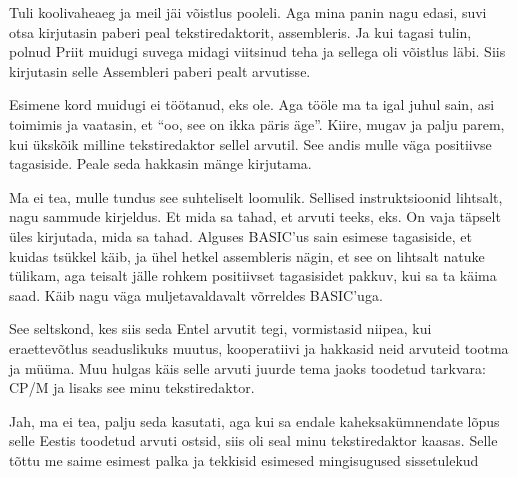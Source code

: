 Tuli koolivaheaeg ja meil jäi võistlus pooleli. Aga mina panin nagu edasi, suvi 
otsa kirjutasin paberi peal tekstiredaktorit, assembleris. Ja kui tagasi tulin, 
polnud  Priit muidugi suvega midagi viitsinud teha ja sellega oli võistlus 
läbi. Siis kirjutasin selle Assembleri paberi pealt arvutisse.


Esimene kord muidugi ei töötanud, eks ole. Aga tööle ma ta igal juhul sain, asi 
toimimis ja  vaatasin, et \enquote{oo, see on ikka päris äge}. Kiire, mugav ja 
palju parem, kui ükskõik milline tekstiredaktor sellel arvutil. See andis mulle 
väga positiivse tagasiside. Peale seda hakkasin mänge kirjutama.


Ma ei tea, mulle tundus see suhteliselt loomulik. Sellised instruktsioonid 
lihtsalt, nagu sammude kirjeldus. Et mida sa tahad, et arvuti teeks, eks. On 
vaja täpselt üles kirjutada, mida sa tahad. Alguses BASIC'us sain esimese 
tagasiside, et kuidas tsükkel käib, ja ühel hetkel assembleris nägin, et see on 
lihtsalt natuke tülikam, aga teisalt jälle rohkem positiivset tagasisidet 
pakkuv, kui sa ta käima saad. Käib nagu väga muljetavaldavalt võrreldes 
BASIC'uga. 


See seltskond, kes siis seda Entel arvutit tegi, 
vormistasid niipea, kui eraettevõtlus seaduslikuks muutus, kooperatiivi ja 
hakkasid  neid arvuteid tootma ja müüma. Muu hulgas käis selle arvuti juurde 
tema jaoks toodetud tarkvara: CP/M ja  lisaks see minu tekstiredaktor.


Jah, ma ei tea, palju seda kasutati, aga kui sa endale kaheksakümnendate lõpus 
selle Eestis toodetud arvuti ostsid, siis oli seal minu tekstiredaktor kaasas. 
Selle tõttu me saime esimest palka ja tekkisid esimesed mingisugused 
sissetulekud



